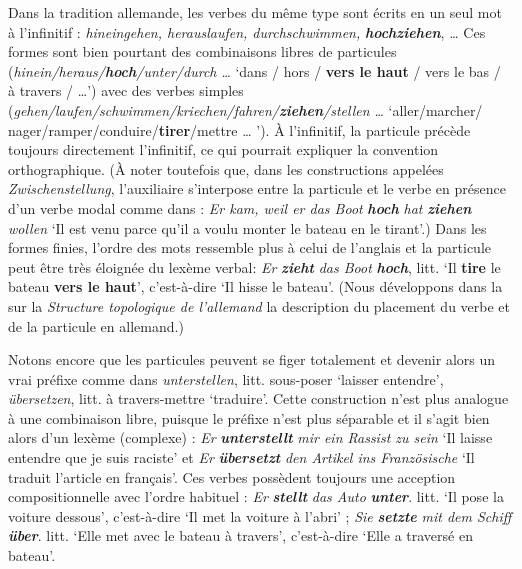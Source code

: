 {    Dans la tradition allemande, les verbes du même type sont écrits en un seul mot à l’infinitif : \textit{hineingehen, herauslaufen, durchschwimmen,} \textbf{\textit{hochziehen}}, \textit{…} Ces formes sont bien pourtant des combinaisons libres de particules (\textit{hinein/heraus/}\textbf{\textit{hoch}}\textit{/unter/durch} \textit{…} ‘dans / hors / \textbf{vers le haut} / vers le bas / à travers / …’) avec des verbes simples (\textit{gehen/laufen/schwimmen/kriechen/fahren/}\textbf{\textit{ziehen}}\textit{/stellen} \textit{…} ‘aller/marcher/ nager/ramper/conduire/\textbf{tirer}/mettre … ’). À l’infinitif, la particule précède toujours directement l’infinitif, ce qui pourrait expliquer la convention orthographique. (À noter toutefois que, dans les constructions appelées \textit{Zwischenstellung}, l’auxiliaire s’interpose entre la particule et le verbe en présence d’un verbe modal comme dans : \textit{Er kam, weil er das Boot} \textbf{\textit{hoch}} \textit{hat} \textbf{\textit{ziehen}} \textit{wollen} ‘Il est venu parce qu’il a voulu monter le bateau en le tirant’.) Dans les formes finies, l’ordre des mots ressemble plus à celui de l’anglais et la particule peut être très éloignée du lexème verbal: \textit{Er} \textbf{\textit{zieht}} \textit{das Boot} \textbf{\textit{hoch}}, litt. ‘Il \textbf{tire} le bateau \textbf{vers le haut}’, c’est-à-dire ‘Il hisse le bateau’. (Nous développons dans la  sur la \textit{Structure topologique de l’allemand} la description du placement du verbe et de la particule en allemand.)

    Notons encore que les particules peuvent se figer totalement et devenir alors un vrai préfixe comme dans \textit{unterstellen}, litt. sous-poser ‘laisser entendre’, \textit{übersetzen}, litt. à travers-mettre ‘traduire’. Cette construction n’est plus analogue à une combinaison libre, puisque le préfixe n’est plus séparable et il s’agit bien alors d’un lexème (complexe) : \textit{Er} \textbf{\textit{unterstellt}} \textit{mir ein Rassist zu sein} ‘Il laisse entendre que je suis raciste’ et \textit{Er} \textbf{\textit{übersetzt}} \textit{den Artikel ins Französische} ‘Il traduit l’article en français’. Ces verbes possèdent toujours une acception compositionnelle avec l’ordre habituel : \textit{Er} \textbf{\textit{stellt}} \textit{das Auto} \textbf{\textit{unter}}. litt. ‘Il pose la voiture dessous’, c’est-à-dire ‘Il met la voiture à l’abri’ ; \textit{Sie} \textbf{\textit{setzte}} \textit{mit dem Schiff} \textbf{\textit{über}}. litt. ‘Elle met avec le bateau à travers’, c’est-à-dire ‘Elle a traversé en bateau’.

}
